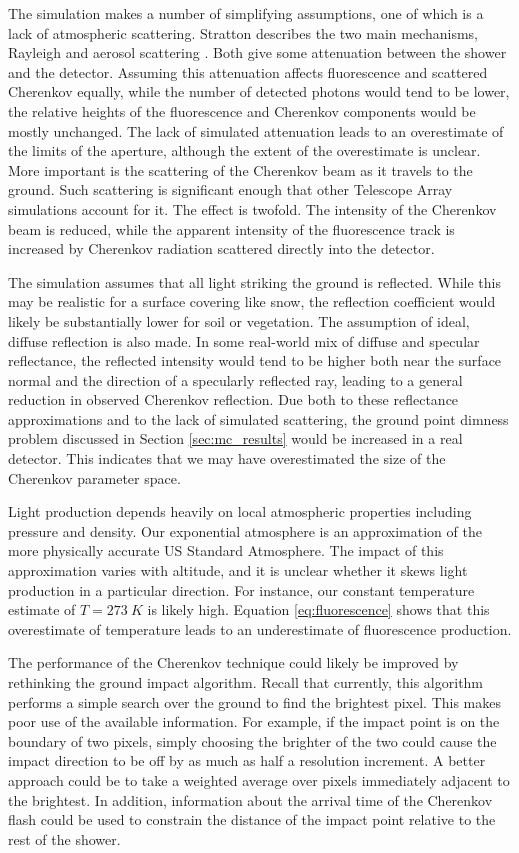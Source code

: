 The simulation makes a number of simplifying assumptions, one of which is a lack of atmospheric scattering. Stratton describes the two main mechanisms, Rayleigh and aerosol scattering \cite{stratton2012ta}. Both give some attenuation between the shower and the detector. Assuming this attenuation affects fluorescence and scattered Cherenkov equally, while the number of detected photons would tend to be lower, the relative heights of the fluorescence and Cherenkov components would be mostly unchanged. The lack of simulated attenuation leads to an overestimate of the limits of the aperture, although the extent of the overestimate is unclear. More important is the scattering of the Cherenkov beam as it travels to the ground. Such scattering is significant enough that other Telescope Array simulations account for it. The effect is twofold. The intensity of the Cherenkov beam is reduced, while the apparent intensity of the fluorescence track is increased by Cherenkov radiation scattered directly into the detector.

The simulation assumes that all light striking the ground is reflected. While this may be realistic for a surface covering like snow, the reflection coefficient would likely be substantially lower for soil or vegetation. The assumption of ideal, diffuse reflection is also made. In some real-world mix of diffuse and specular reflectance, the reflected intensity would tend to be higher both near the surface normal and the direction of a specularly reflected ray, leading to a general reduction in observed Cherenkov reflection. Due both to these reflectance approximations and to the lack of simulated scattering, the ground point dimness problem discussed in Section \ref{sec:mc_results} would be increased in a real detector. This indicates that we may have overestimated the size of the Cherenkov parameter space.

Light production depends heavily on local atmospheric properties including pressure and density. Our exponential atmosphere is an approximation of the more physically accurate US Standard Atmosphere. The impact of this approximation varies with altitude, and it is unclear whether it skews light production in a particular direction. For instance, our constant temperature estimate of $T = \SI{273}{K}$ is likely high. Equation \ref{eq:fluorescence} shows that this overestimate of temperature leads to an underestimate of fluorescence production.

The performance of the Cherenkov technique could likely be improved by rethinking the ground impact algorithm. Recall that currently, this algorithm performs a simple search over the ground to find the brightest pixel. This makes poor use of the available information. For example, if the impact point is on the boundary of two pixels, simply choosing the brighter of the two could cause the impact direction to be off by as much as half a resolution increment. A better approach could be to take a weighted average over pixels immediately adjacent to the brightest. In addition, information about the arrival time of the Cherenkov flash could be used to constrain the distance of the impact point relative to the rest of the shower.

